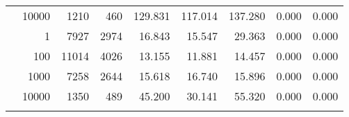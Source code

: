 \begin{table}
\begin{tabular}{rrrrrrrrr}
	            
					 &  
					 
					\multirow{ 1 }{*}{ 10000 } &
					
						
							    
							     1210  & 460  
	                           & 129.831 & 117.014 & 137.280
	                           & 0.000 & 0.000  \\
	                
	            
	        
				\noalign{\smallskip}\hline
				\multirow{ 4 }{*}{ 500000 } &
				
					
					 
					\multirow{ 1 }{*}{ 1 } &
					
						
							    
							     7927  & 2974  
	                           & 16.843 & 15.547 & 29.363
	                           & 0.000 & 0.000  \\
	                
	            
					 &  
					 
					\multirow{ 1 }{*}{ 100 } &
					
						
							    
							     11014  & 4026  
	                           & 13.155 & 11.881 & 14.457
	                           & 0.000 & 0.000  \\
	                
	            
					 &  
					 
					\multirow{ 1 }{*}{ 1000 } &
					
						
							    
							     7258  & 2644  
	                           & 15.618 & 16.740 & 15.896
	                           & 0.000 & 0.000  \\
	                
	            
					 &  
					 
					\multirow{ 1 }{*}{ 10000 } &
					
						
							    
							     1350  & 489  
	                           & 45.200 & 30.141 & 55.320
	                           & 0.000 & 0.000  \\
	                
	            
	        
				\noalign{\smallskip}\hline
				\multirow{ 4 }{*}{ 1000000 } &
				

\end{tabular}
\end{table}
